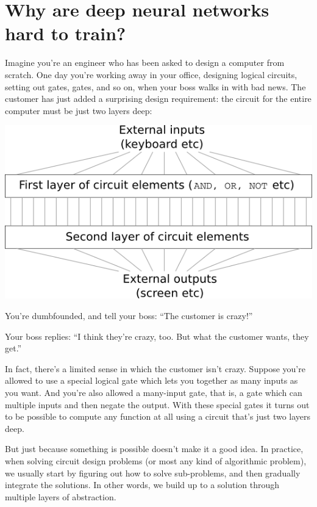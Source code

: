 \documentclass[a4paper,twoside,10pt]{book}
\begin{document}
\chapter{Why are deep neural networks hard to train?}
Imagine you're an engineer who has been asked to design a computer from scratch. One day you're working away in your office, designing logical circuits, setting out  gates,  gates, and so on, when your boss walks in with bad news. The customer has just added a surprising design requirement: the circuit for the entire computer must be just two layers deep:
\begin{center}
	\includegraphics[width=0.7\linewidth]{figures/ch5/shallow_circuit}
\end{center}
You're dumbfounded, and tell your boss: ``The customer is crazy!''

Your boss replies: ``I think they're crazy, too. But what the customer wants, they get.''

In fact, there's a limited sense in which the customer isn't crazy. Suppose you're allowed to use a special logical gate which lets you  together as many inputs as you want. And you're also allowed a many-input  gate, that is, a gate which can  multiple inputs and then negate the output. With these special gates it turns out to be possible to compute any function at all using a circuit that's just two layers deep.

But just because something is possible doesn't make it a good idea. In practice, when solving circuit design problems (or most any kind of algorithmic problem), we usually start by figuring out how to solve sub-problems, and then gradually integrate the solutions. In other words, we build up to a solution through multiple layers of abstraction.
\end{document}
